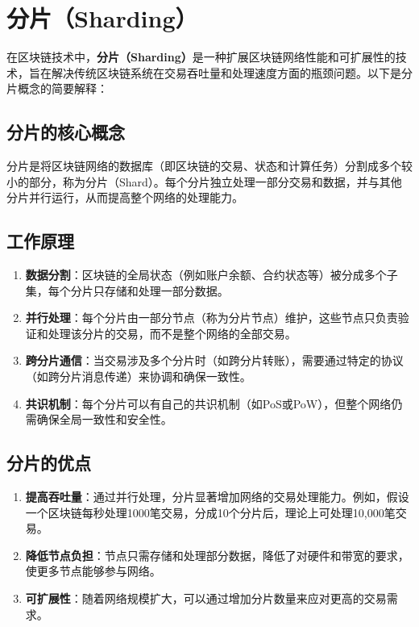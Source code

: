 \documentclass[12pt]{ctexart}
\begin{document}
\section{分片（Sharding）}
在区块链技术中，\textbf{分片（Sharding）}是一种扩展区块链网络性能和可扩展性的技术，旨在解决传统区块链系统在交易吞吐量和处理速度方面的瓶颈问题。以下是分片概念的简要解释：

\subsection{分片的核心概念}
分片是将区块链网络的数据库（即区块链的交易、状态和计算任务）分割成多个较小的部分，称为分片（Shard）。每个分片独立处理一部分交易和数据，并与其他分片并行运行，从而提高整个网络的处理能力。

\subsection{工作原理}
\begin{enumerate}
  \item \textbf{数据分割}：区块链的全局状态（例如账户余额、合约状态等）被分成多个子集，每个分片只存储和处理一部分数据。
  \item \textbf{并行处理}：每个分片由一部分节点（称为分片节点）维护，这些节点只负责验证和处理该分片的交易，而不是整个网络的全部交易。
  \item \textbf{跨分片通信}：当交易涉及多个分片时（如跨分片转账），需要通过特定的协议（如跨分片消息传递）来协调和确保一致性。
  \item \textbf{共识机制}：每个分片可以有自己的共识机制（如PoS或PoW），但整个网络仍需确保全局一致性和安全性。
\end{enumerate}

\subsection{分片的优点}
\begin{enumerate}
  \item \textbf{提高吞吐量}：通过并行处理，分片显著增加网络的交易处理能力。例如，假设一个区块链每秒处理1000笔交易，分成10个分片后，理论上可处理10,000笔交易。
  \item \textbf{降低节点负担}：节点只需存储和处理部分数据，降低了对硬件和带宽的要求，使更多节点能够参与网络。
  \item \textbf{可扩展性}：随着网络规模扩大，可以通过增加分片数量来应对更高的交易需求。
\end{enumerate}
\end{document}

